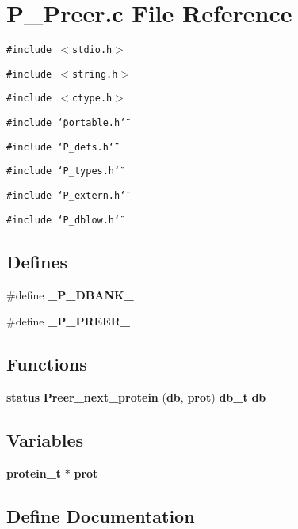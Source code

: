 \section{P\_\-Preer.c File Reference}
\label{P__Preer_8c}
{\tt \#include $<$stdio.h$>$}\par
{\tt \#include $<$string.h$>$}\par
{\tt \#include $<$ctype.h$>$}\par
{\tt \#include \char`\"{}portable.h\char`\"{}}\par
{\tt \#include \char`\"{}P\_\-defs.h\char`\"{}}\par
{\tt \#include \char`\"{}P\_\-types.h\char`\"{}}\par
{\tt \#include \char`\"{}P\_\-extern.h\char`\"{}}\par
{\tt \#include \char`\"{}P\_\-dblow.h\char`\"{}}\par
\subsection*{Defines}
\begin{CompactItemize}
\item 
\#define {\bf \_\-P\_\-DBANK\_\-}
\item 
\#define {\bf \_\-P\_\-PREER\_\-}
\end{CompactItemize}
\subsection*{Functions}
\begin{CompactItemize}
\item 
{\bf status} {\bf Preer\_\-next\_\-protein} ({\bf db}, {\bf prot}) {\bf db\_\-t} {\bf db}
\end{CompactItemize}
\subsection*{Variables}
\begin{CompactItemize}
\item 
{\bf protein\_\-t} $\ast$ {\bf prot}
\end{CompactItemize}


\subsection{Define Documentation}
